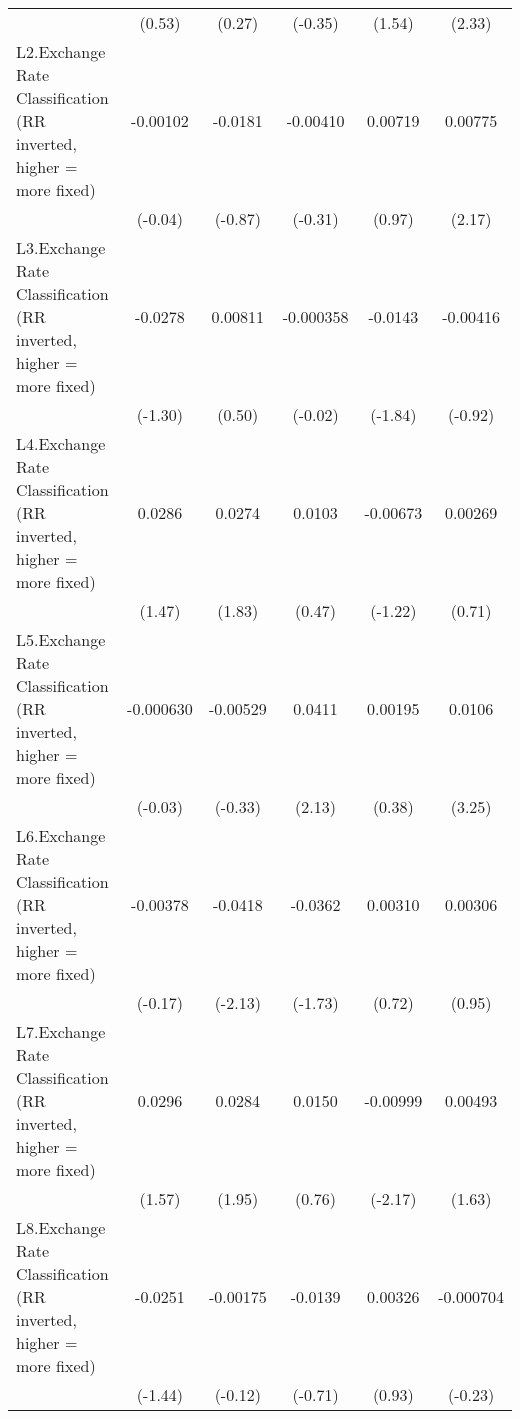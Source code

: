 {\begin{longtable}{l*{5}{c}}
                &   (0.53)         &   (0.27)         &  (-0.35)         &   (1.54)         &   (2.33)         \\
[1em]
L2.Exchange Rate Classification (RR inverted, higher = more fixed)& -0.00102         &  -0.0181         & -0.00410         &  0.00719         &  0.00775\sym{*}  \\
                &  (-0.04)         &  (-0.87)         &  (-0.31)         &   (0.97)         &   (2.17)         \\
[1em]
L3.Exchange Rate Classification (RR inverted, higher = more fixed)&  -0.0278         &  0.00811         &-0.000358         &  -0.0143         & -0.00416         \\
                &  (-1.30)         &   (0.50)         &  (-0.02)         &  (-1.84)         &  (-0.92)         \\
[1em]
L4.Exchange Rate Classification (RR inverted, higher = more fixed)&   0.0286         &   0.0274         &   0.0103         & -0.00673         &  0.00269         \\
                &   (1.47)         &   (1.83)         &   (0.47)         &  (-1.22)         &   (0.71)         \\
[1em]
L5.Exchange Rate Classification (RR inverted, higher = more fixed)&-0.000630         & -0.00529         &   0.0411\sym{*}  &  0.00195         &   0.0106\sym{**} \\
                &  (-0.03)         &  (-0.33)         &   (2.13)         &   (0.38)         &   (3.25)         \\
[1em]
L6.Exchange Rate Classification (RR inverted, higher = more fixed)& -0.00378         &  -0.0418\sym{*}  &  -0.0362         &  0.00310         &  0.00306         \\
                &  (-0.17)         &  (-2.13)         &  (-1.73)         &   (0.72)         &   (0.95)         \\
[1em]
L7.Exchange Rate Classification (RR inverted, higher = more fixed)&   0.0296         &   0.0284         &   0.0150         & -0.00999\sym{*}  &  0.00493         \\
                &   (1.57)         &   (1.95)         &   (0.76)         &  (-2.17)         &   (1.63)         \\
[1em]
L8.Exchange Rate Classification (RR inverted, higher = more fixed)&  -0.0251         & -0.00175         &  -0.0139         &  0.00326         &-0.000704         \\
                &  (-1.44)         &  (-0.12)         &  (-0.71)         &   (0.93)         &  (-0.23)         \\

\end{longtable}}

